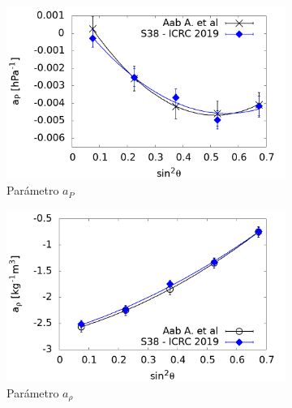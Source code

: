             \begin{figure}[H]
                \begin{subfigure}[b]{0.5\textwidth}
                \includegraphics[width=\linewidth]{Graphs/params/ap_ICRC_2019_S38_above_0EeV.png}
                \caption{Parámetro $a_P$ }
                \label{fig:ap_2019_S38}
                \end{subfigure}%
                \hspace{\fill}
                \begin{subfigure}[b]{0.5\textwidth}
                \includegraphics[width=\linewidth]{Graphs/params/arho_ICRC_2019_S38_above_0EeV.png}
                \caption{Parámetro $a_{\rho}$ }
                \label{fig:arho_2019_S38}
                \end{subfigure}%
                \hspace{\fill}
                \begin{subfigure}[b]{\textwidth}

\end{subfigure}
\end{figure}
